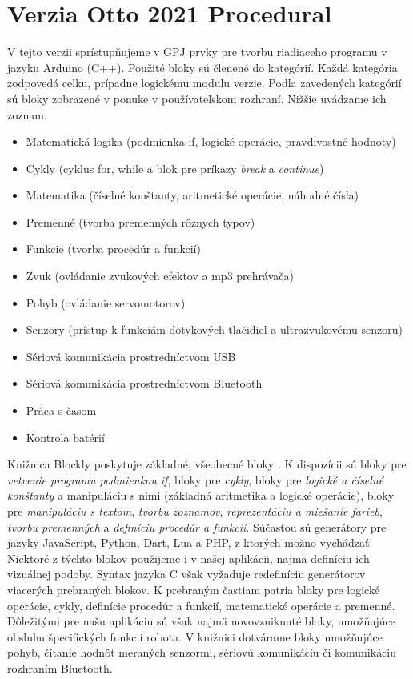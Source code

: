 \section{Verzia Otto 2021 Procedural}
V tejto verzii sprístupňujeme v GPJ prvky pre tvorbu riadiaceho programu v jazyku Arduino (C++). Použité bloky sú členené do kategórií. Každá kategória zodpovedá  celku, prípadne logickému modulu verzie. Podľa zavedených kategórií sú bloky zobrazené v ponuke v používateľskom rozhraní. Nižšie uvádzame ich zoznam.

\begin{itemize}[topsep=8pt,itemsep=0.1pt,partopsep=4pt, parsep=4pt]
\item Matematická logika (podmienka if, logické operácie, pravdivostné hodnoty)
\item Cykly (cyklus for, while a blok pre príkazy \textit{break} a \textit{continue})
\item Matematika (číselné konštanty, aritmetické operácie, náhodné čísla)
\item Premenné (tvorba premenných rôznych typov)
\item Funkcie (tvorba procedúr a funkcií)
\item Zvuk (ovládanie zvukových efektov a mp3 prehrávača)
\item Pohyb (ovládanie servomotorov)
\item Senzory (prístup k funkciám dotykových tlačidiel a ultrazvukovému senzoru)
\item Sériová komunikácia prostredníctvom USB
\item Sériová komunikácia prostredníctvom Bluetooth
\item Práca s časom
\item Kontrola batérií
\end{itemize}

Knižnica Blockly poskytuje základné, všeobecné bloky . K dispozícii sú bloky pre \textit{vetvenie programu podmienkou if}, bloky pre \textit{cykly}, bloky pre \textit{logické a číselné konštanty} a manipuláciu s nimi (základná aritmetika a logické operácie), bloky pre \textit{manipuláciu s textom}, \textit{tvorbu zoznamov}, \textit{reprezentáciu a miešanie farieb}, \textit{tvorbu premenných} a \textit{definíciu procedúr a funkcií}. Súčasťou sú generátory pre jazyky JavaScript, Python, Dart, Lua a PHP, z ktorých možno vychádzať. Niektoré z týchto blokov použijeme i v našej aplikácii, najmä definíciu ich vizuálnej podoby. Syntax jazyka C však vyžaduje redefiníciu generátorov viacerých prebraných blokov. K prebraným častiam patria bloky pre logické operácie, cykly, definície procedúr a funkcií, matematické operácie a premenné. Dôležitými pre našu aplikáciu sú však najmä novovzniknuté bloky, umožňujúce obsluhu špecifických funkcií robota. V knižnici dotvárame bloky umožňujúce pohyb, čítanie hodnôt meraných senzormi, sériovú komunikáciu či komunikáciu rozhraním Bluetooth. 

